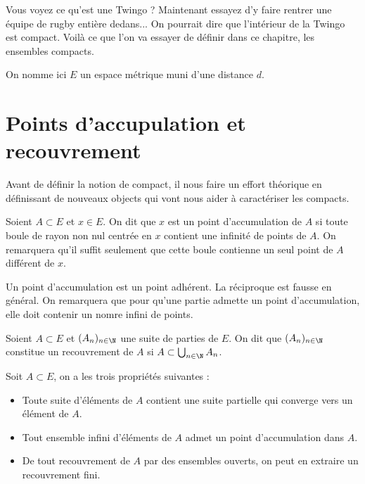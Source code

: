 
Vous voyez ce qu'est une Twingo ? Maintenant essayez d'y faire rentrer une équipe de rugby entière dedans...
On pourrait dire que l'intérieur de la Twingo est compact. Voilà ce que l'on va essayer de définir dans ce chapitre, les ensembles compacts. 

\vspace{0.3cm}

On nomme ici $E$ un espace métrique muni d'une distance $d$. 


\section{Points d'accupulation et recouvrement}

Avant de définir la notion de compact, il nous faire un effort théorique en définissant de nouveaux objects
qui vont nous aider à caractériser les compacts. 

\begin{definition}
    Soient $A \subset E$ et $x \in E$. On dit que $x$ est un point d'accumulation de $A$ si toute boule de rayon non nul 
    centrée en $x$ contient une infinité de points de $A$. On remarquera qu'il suffit seulement que cette boule contienne 
    un seul point de $A$ différent de $x$. 
\end{definition}

\begin{remark}
    Un point d'accumulation est un point adhérent. La réciproque est fausse en général. 
    On remarquera que pour qu'une partie admette un point d'accumulation, elle doit contenir un nomre infini de points. 
\end{remark}

\begin{definition}[Recouvrement]
    Soient $A \subset E$ et $(A_n)_{n \in \N}$ une suite de parties de $E$. On dit que $(A_n)_{n \in \N}$ constitue 
    un recouvrement de $A$ si $ A \subset \bigcup_{n \in \N} A_n $. 
\end{definition}

\begin{proposition}
    Soit $A \subset E$, on a les trois propriétés suivantes :
    \begin{itemize}
        \item Toute suite d'éléments de $A$ contient une suite partielle qui converge vers un élément de $A$. 
        \item Tout ensemble infini d'éléments de $A$ admet un point d'accumulation dans $A$. 
        \item De tout recouvrement de $A$ par des ensembles ouverts, on peut en extraire un recouvrement fini. 
    \end{itemize}
\end{proposition}



